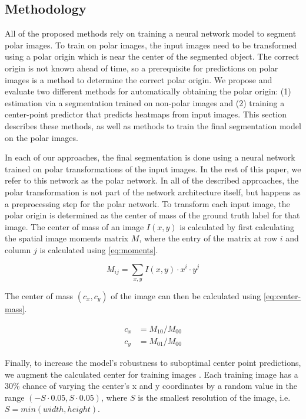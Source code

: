   \subsection{Methodology}
  
All of the proposed methods rely on training a neural network model to segment polar images. To train on 
polar images, the input images need to be transformed using a polar origin which is near the center of 
the 
segmented object. The correct origin is not known ahead of time, so a prerequisite for predictions on polar
images is a method to determine the correct polar origin. We propose and 
evaluate two different methods for automatically obtaining the polar origin: (1)
estimation via a segmentation trained on non-polar images and (2) training a center-point predictor that predicts heatmaps from input images. 
This section describes these methods, as well as methods to train the 
final segmentation model on the polar images.
      
In each of our approaches, the final segmentation is done using a neural network trained on polar 
transformations of the input images. In the rest of this paper, we refer to this network as the polar 
network. In all of the described approaches, the polar transformation is not part of the network architecture itself, but happens as a preprocessing step for the polar network.
To transform each input image, the polar origin is determined as the center of mass of the 
ground truth label for that image. The center of mass of an image $I(x, y)$ is calculated by first 
calculating the spatial image moments matrix $M$, where the entry of the matrix at row $i$ and column $j$ is calculated using \eqref{eq:moments}.

  \begin{equation}
    M_{ij}= \sum _{x,y} I(x,y) \cdot x^i \cdot y^j
    \label{eq:moments}
  \end{equation}
  
The center of mass $(c_x, c_y)$ of the image can then be calculated using \eqref{eq:center-mass}.

  \begin{equation}
    \begin{aligned}
      c_x &= M_{10} / M_{00} \\
      c_y &= M_{01} / M_{00}
    \end{aligned}
    \label{eq:center-mass}
  \end{equation}

Finally, to increase the model's robustness to suboptimal center point predictions, we augment the 
calculated center for training images \cite{estevesPolarTransformerNetworks2018a}. Each training image has 
a 30\% chance of varying the center's x and y coordinates by a random value in the range $(-S \cdot 0.05, 
S \cdot 0.05)$, where $S$ is the smallest resolution of the image, i.e. $S = min(width, height)$.
 
